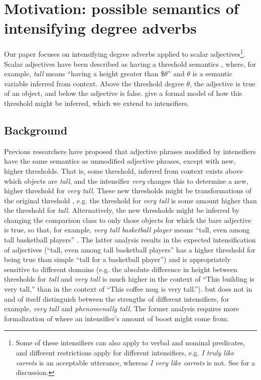 \documentclass[10pt,letterpaper]{article}
\newcommand{\w}[1]{\emph{#1}}
\begin{document}
\section{Motivation: possible semantics of intensifying degree adverbs}

Our paper focuses on intensifying degree adverbs applied to scalar adjectives\footnote{Some of these intensifiers can also apply to verbal and nominal predicates, and different restrictions apply for different intensifiers, e.g. \w{I truly like carrots} is an acceptable utterance, whereas \w{I very like carrots} is not. See  for a discussion.}. Scalar adjectives have been described as having a threshold semantics \cite{kennedy}, where, for example, \w{tall} means ``having a height greater than \$$\theta$'' and $\theta$ is a %
semantic variable inferred from context. Above the threshold degree $\theta$, the adjective is true of an object, and below the adjective is false.
 give a formal model of how this threshold might be inferred, which we extend to intensifiers.

\subsection{Background}
Previous researchers have proposed that adjective phrases modified by intensifiers have the same semantics as unmodified adjective phrases, except with new, higher thresholds. That is, some threshold, inferred from context exists above which objects are \w{tall}, and the intensifier \w{very} changes this to determine a new, higher threshold for \w{very tall}. These new thresholds might be transformations of the original threshold \cite{kennedyMcnally1999}, e.g. the threshold for \w{very tall} is some amount higher than the threshold for \w{tall}.
Alternatively, the new thresholds might be inferred by changing the comparison class to only those objects for which
the bare adjective is true,
so that, for example, \w{very tall basketball player} means ``tall, even among tall basketball players'' \cite{klein, kennedyMcnally, wheeler}.
The latter analysis results in the expected intensification of adjectives (``tall, even among tall basketball players'' has a higher threshold for being true than simple ``tall for a basketball player'') and is appropriately sensitive to different domains (e.g. the absolute difference in height between thresholds for \w{tall} and \w{very tall} is much higher in the context of ``This building is very tall,'' than in the context of ``This coffee mug is very tall.'').
but does not in and of itself distinguish between the strengths of different intensifiers, for example, \w{very tall} and \w{phenomenally tall}.
The former analysis requires more formalization of where an intensifier's amount of boost might come from.
\end{document}
